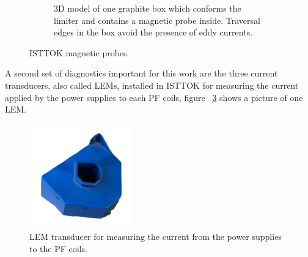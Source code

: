 \begin{figure}
\begin{subfigure}[b]{0.37\textwidth}
		\caption{\label{limiterBox} 3D model of one graphite box which conforms the limiter and contains a magnetic probe inside. Traversal edges in the box avoid the presence of eddy currents.   }
	\end{subfigure}
	\caption{ ISTTOK magnetic probes.\label{all_mirnv} }
\end{figure}



A second set of diagnostics important for this work are the three current transducers, also called LEMs, installed in ISTTOK for measuring the current applied by the power supplies  to each  PF coils, figure ~\ref{LEM} shows a picture of one LEM.

\smallskip


\begin{figure}[htbp]
	\centering
	\includegraphics[width=0.4\textwidth]{Chp4/LEM.png}
	\caption{\label{LEM} LEM transducer for measuring the current from the power supplies to the PF coils.  }
\end{figure}

